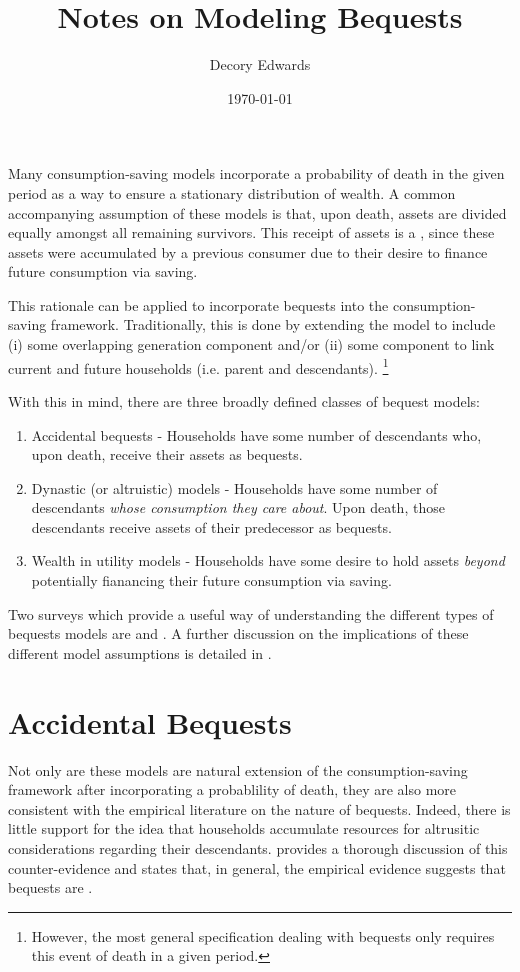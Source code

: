 \documentclass{article}
\title{Notes on Modeling Bequests}
\author{Decory Edwards}
\date{\today}
\begin{document}
\maketitle

Many consumption-saving models incorporate a probability of death in the given period as a way to ensure a stationary distribution of wealth. A common accompanying assumption of these models is that, upon death, assets are divided equally amongst all remaining survivors. This receipt of assets is a , since these assets were accumulated by a previous consumer due to their desire to finance future consumption via saving.

This rationale can be applied to incorporate bequests into the consumption-saving framework. Traditionally, this is done by extending the model to include (i) some overlapping generation component and/or (ii) some component to link current and future households (i.e. parent and descendants). \footnote{However, the most general specification dealing with bequests only requires this  event of death in a given period.}

With this in mind, there are three broadly defined classes of bequest models:

\begin{enumerate}
\item Accidental bequests - Households have some number of descendants who, upon death, receive their assets as bequests.
\item Dynastic (or altruistic) models - Households have some number of descendants \textit{whose consumption they care about}. Upon death, those descendants receive assets of their predecessor as bequests.
\item Wealth in utility models - Households have some desire to hold assets \textit{beyond} potentially fianancing their future consumption via saving. 
\end{enumerate}

Two surveys which provide a useful way of understanding the different types of bequests models are \cite{Laitner2002-hu} and \cite{Cagetti2008-cc}. A further discussion on the implications of these different model assumptions is detailed in \cite{Carroll1998-tz}.

\section{Accidental Bequests}

Not only are these models are natural extension of the consumption-saving framework after incorporating a probablility of death, they are also more consistent with the empirical literature on the nature of bequests. Indeed, there is little support for the idea that households accumulate resources for altrusitic considerations regarding their descendants. \cite{Gokhale2001-dj} provides a thorough discussion of this counter-evidence and states that, in general, the empirical evidence suggests that bequests are .
\end{document}
